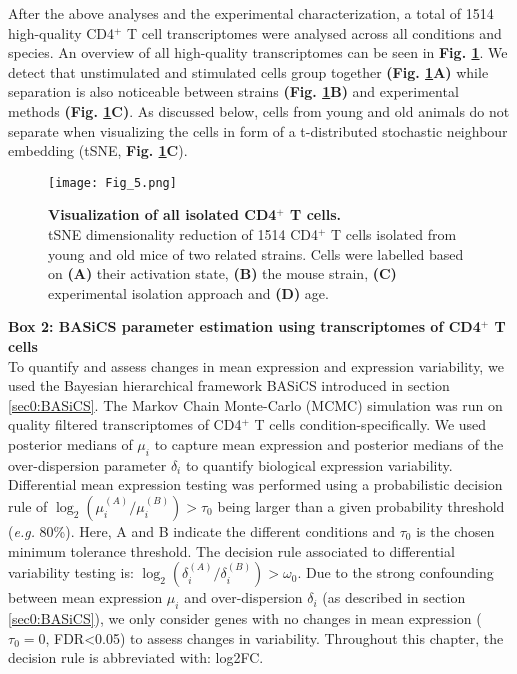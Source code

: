 \captionsetup[figure]{list=yes}

After the above analyses and the experimental characterization, a total of 1514 high-quality CD4$^+$ T cell transcriptomes were analysed across all conditions and species. An overview of all high-quality transcriptomes can be seen in \textbf{Fig. \ref{fig1:all_cells}}. We detect that unstimulated and stimulated cells group together \textbf{(Fig. \ref{fig1:all_cells}A)} while separation is also noticeable between strains \textbf{(Fig. \ref{fig1:all_cells}B)} and experimental methods \textbf{(Fig. \ref{fig1:all_cells}C)}. As discussed below, cells from young and old animals do not separate when visualizing the cells in form of a t-distributed stochastic neighbour embedding (tSNE, \textbf{Fig. \ref{fig1:all_cells}C}). 

\newpage

\begin{figure}[!hb]
\centering
\texttt{[image: Fig\_5.png]}
\caption[Visualization of all isolated CD4$^+$ T cells]{\textbf{Visualization of all isolated CD4$^+$ T cells.}\\
tSNE dimensionality reduction of 1514 CD4$^+$ T cells isolated from young and old mice of two related strains. Cells were labelled based on \textbf{(A)} their activation state, \textbf{(B)} the mouse strain, \textbf{(C)} experimental isolation approach and \textbf{(D)} age.}
\label{fig1:all_cells}
\end{figure}

\begin{Comment}
\textbf{Box 2: BASiCS parameter estimation using transcriptomes of CD4$^+$ T cells}\\
To quantify and assess changes in mean expression and expression variability, we used the Bayesian hierarchical framework BASiCS introduced in section \ref{sec0:BASiCS}. The Markov Chain Monte-Carlo (MCMC) simulation was run on quality filtered transcriptomes of CD4$^+$ T cells condition-specifically. We used posterior medians of $\mu_i$ to capture mean expression and posterior medians of the over-dispersion parameter $\delta_i$ to quantify biological expression variability. Differential mean expression testing was performed using a probabilistic decision rule of $\log_2(\mu_i^{(A)}/\mu_i^{(B)})>\tau_0$ being larger than a given probability threshold (\emph{e.g.} 80\%). Here, A and B indicate the different conditions and $\tau_0$ is the chosen minimum tolerance threshold. The decision rule associated to differential variability testing is: $\log_2(\delta_i^{(A)}/\delta_i^{(B)})>\omega_0$. Due to the strong confounding between mean expression $\mu_i$ and over-dispersion $\delta_i$ (as described in section \ref{sec0:BASiCS}), we only consider genes with no changes in mean expression ($\tau_0=0$, FDR<0.05) to assess changes in variability. Throughout this chapter, the decision rule is abbreviated with: log2FC. 
\end{Comment}

